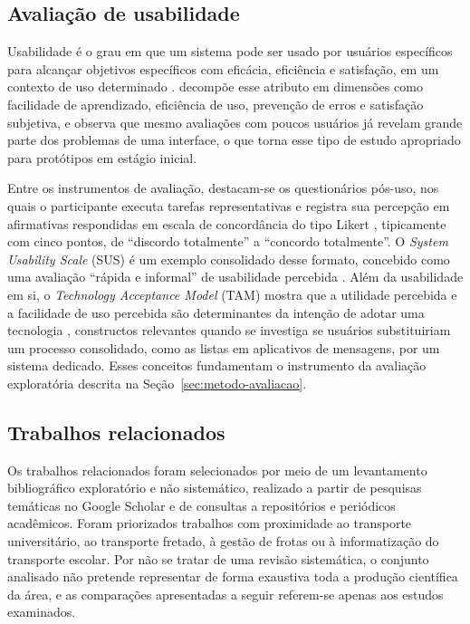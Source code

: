 \documentclass[a4paper,12pt]{article}
\begin{document}
\subsection{Avaliação de usabilidade}
\label{sec:fund-usabilidade}

Usabilidade é o grau em que um sistema pode ser usado por usuários específicos para alcançar objetivos específicos com eficácia, eficiência e satisfação, em um contexto de uso determinado \cite{iso9241}.  decompõe esse atributo em dimensões como facilidade de aprendizado, eficiência de uso, prevenção de erros e satisfação subjetiva, e observa que mesmo avaliações com poucos usuários já revelam grande parte dos problemas de uma interface, o que torna esse tipo de estudo apropriado para protótipos em estágio inicial.

Entre os instrumentos de avaliação, destacam-se os questionários pós-uso, nos quais o participante executa tarefas representativas e registra sua percepção em afirmativas respondidas em escala de concordância do tipo Likert \cite{likert1932}, tipicamente com cinco pontos, de ``discordo totalmente'' a ``concordo totalmente''. O \textit{System Usability Scale} (SUS) é um exemplo consolidado desse formato, concebido como uma avaliação ``rápida e informal'' de usabilidade percebida \cite{brooke1996}. Além da usabilidade em si, o \textit{Technology Acceptance Model} (TAM) mostra que a utilidade percebida e a facilidade de uso percebida são determinantes da intenção de adotar uma tecnologia \cite{davis1989}, constructos relevantes quando se investiga se usuários substituiriam um processo consolidado, como as listas em aplicativos de mensagens, por um sistema dedicado. Esses conceitos fundamentam o instrumento da avaliação exploratória descrita na Seção~\ref{sec:metodo-avaliacao}.

\subsection{Trabalhos relacionados}
\label{sec:trabalhos}

Os trabalhos relacionados foram selecionados por meio de um levantamento bibliográfico exploratório e não sistemático, realizado a partir de pesquisas temáticas no Google Scholar e de consultas a repositórios e periódicos acadêmicos. Foram priorizados trabalhos com proximidade ao transporte universitário, ao transporte fretado, à gestão de frotas ou à informatização do transporte escolar. Por não se tratar de uma revisão sistemática, o conjunto analisado não pretende representar de forma exaustiva toda a produção científica da área, e as comparações apresentadas a seguir referem-se apenas aos estudos examinados.
\end{document}
